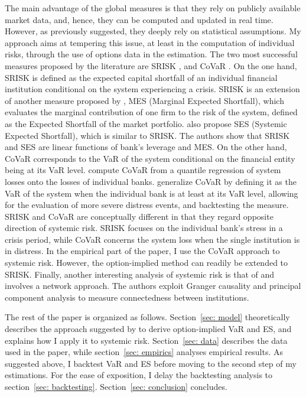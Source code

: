 \documentclass[11pt,a4paper,english]{article}
\begin{document}
The main advantage of the global measures is that they rely on publicly available market data, and, hence, they can be computed and updated in real time. However, as previously suggested, they deeply rely on statistical assumptions. My approach aims at tempering this issue, at least in the computation of individual risks, through the use of options data in the estimation. The two most successful measures proposed by the literature are SRISK \citep{Acharya2012, Brownless2016}, and CoVaR \citep{Adrian2016}. On the one hand, SRISK is defined as the expected capital shortfall of an individual financial institution conditional on the system experiencing a crisis. SRISK is an extension of another measure proposed by \citet{Acharya2017}, MES (Marginal Expected Shortfall), which evaluates the marginal contribution of one firm to the risk of the system, defined as the Expected Shortfall of the market portfolio. \citet{Acharya2017} also propose SES (Systemic Expected Shortfall), which is similar to SRISK. The authors show that SRISK and SES are linear functions of bank's leverage and MES. On the other hand, CoVaR corresponds to the VaR of the system conditional on the financial entity being at its VaR level. \citet{Adrian2016} compute CoVaR from a quantile regression of system losses onto the losses of individual banks. \citet{Girardi2013} generalize CoVaR by defining it as the VaR of the system when the individual bank is at least at its VaR level, allowing for the evaluation of more severe distress events, and backtesting the measure. SRISK and CoVaR are conceptually different in that they regard opposite direction of systemic risk. SRISK focuses on the individual bank's stress in a crisis period, while CoVaR concerns the system loss when the single institution is in distress. In the empirical part of the paper, I use the CoVaR approach to systemic risk. However, the option-implied method can readily be extended to SRISK. Finally, another interesting analysis of systemic risk is that of \citet{Billio2012} and involves a network approach. The authors exploit Granger causality and principal component analysis to measure connectedness between institutions.

The rest of the paper is organized as follows. Section~\ref{sec: model} theoretically describes the approach suggested by \citet{GBA16} to derive option-implied VaR and ES, and explains how I apply it to systemic risk. Section~\ref{sec: data} describes the data used in the paper, while section~\ref{sec: empirics} analyses empirical results. As suggested above, I backtest VaR and ES before moving to the second step of my estimations. For the ease of exposition, I delay the backtesting analysis to section~\ref{sec: backtesting}. Section~\ref{sec: conclusion} concludes.
\end{document}
